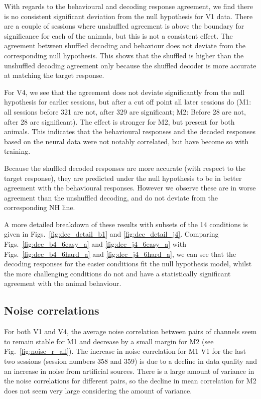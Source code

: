 With regards to the behavioural and decoding response agreement, we find there is no consistent significant deviation from the null hypothesis for \ac{V1} data.
There are a couple of sessions where unshuffled agreement is above the boundary for significance for each of the animals, but this is not a consistent effect.
The agreement between shuffled decoding and behaviour does not deviate from the corresponding null hypothesis.
This shows that the shuffled is higher than the unshuffled decoding agreement only because the shuffled decoder is more accurate at matching the target response.

For \ac{V4}, we see that the agreement does not deviate significantly from the null hypothesis for earlier sessions, but after a cut off point all later sessions do (\ac{M1}: all sessions before 321 are not, after 329 are significant; \ac{M2}: Before 28 are not, after 28 are significant).
The effect is stronger for \ac{M2}, but present for both animals.
This indicates that the behavioural responses and the decoded responses based on the neural data were not notably correlated, but have become so with training.

Because the shuffled decoded responses are more accurate (with respect to the target response), they are predicted under the null hypothesis to be in better agreement with the behavioural responses.
However we observe these are in worse agreement than the unshuffled decoding, and do not deviate from the corresponding NH line.

A more detailed breakdown of these results with subsets of the 14 conditions is given in Figs.~\ref{fig:dec_detail_b1} and \ref{fig:dec_detail_j4}.
Comparing Figs.~\ref{fig:dec_b4_6easy_a} and \ref{fig:dec_j4_6easy_a} with Figs.~\ref{fig:dec_b4_6hard_a} and \ref{fig:dec_j4_6hard_a}, we can see that the decoding responses for the easier conditions fit the null hypothesis model, whilst the more challenging conditions do not and have a statistically significant agreement with the animal behaviour.




\clearpage
\subsection{Noise correlations}

For both \ac{V1} and \ac{V4}, the average noise correlation between pairs of channels seem to remain stable for \ac{M1} and decrease by a small margin for \ac{M2} (see Fig.~\ref{fig:noise_r_all}).
The increase in noise correlation for \ac{M1} \ac{V1} for the last two sessions (session numbers 358 and 359) is due to a decline in data quality and an increase in noise from artificial sources.
There is a large amount of variance in the noise correlations for different pairs, so the decline in mean correlation for \ac{M2} does not seem very large considering the amount of variance.


